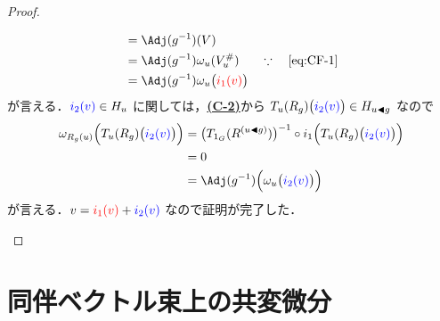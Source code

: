 \documentclass[geometry_main]{subfiles}
\begin{document}
\begin{proof}
\begin{enumerate}
\begin{description}
\begin{description}
\begin{align}
                    &= \Adj (g^{-1})(V) &&\\
                    &= \Adj (g^{-1})\omega_u(V^\#_u) &&\because\quad \text{\eqref{eq:CF-1}}\\
                    &= \Adj (g^{-1})\omega_u\bigl(\textcolor{red}{i_1(v)}\bigr) &&
                \end{align}
                が言える．$\textcolor{blue}{i_2(v)} \in H_u$ に関しては，\hyperref[def:connection]{\textbf{\textsf{(C-2)}}}から $T_u (R_g)\bigl(\textcolor{blue}{i_2(v)}\bigr) \in H_{u \blacktriangleleft g}$ なので
                \begin{align}
                    \omega_{R_g(u)} \Bigl( T_u (R_g)\bigl(\textcolor{blue}{i_2(v)}\bigr) \Bigr) 
                    &= \bigl( T_{1_G}(R^{(u \btl g)}) \bigr)^{-1} \circ i_1 \Bigl(T_u (R_g)\bigl(\textcolor{blue}{i_2(v)}\bigr)\Bigr) \\
                    &= 0 \\
                    &= \Adj(g^{-1}) \Bigl( \omega_u \bigl(\textcolor{blue}{i_2(v)}\bigr) \Bigr) 
                \end{align}
                が言える．$v = \textcolor{red}{i_1(v)} + \textcolor{blue}{i_2(v)}$ なので証明が完了した．
                
                
            \end{description}
            
        \end{description}
        
    \end{enumerate}
\end{proof}

\section{同伴ベクトル束上の共変微分}

\end{document}
